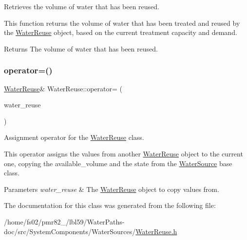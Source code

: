 Retrieves the volume of water that has been reused. 

This function returns the volume of water that has been treated and reused by the \mbox{\hyperlink{classWaterReuse}{Water\+Reuse}} object, based on the current treatment capacity and demand.

\begin{DoxyReturn}{Returns}
The volume of water that has been reused. 
\end{DoxyReturn}
\mbox{\label{classWaterReuse_ab0a905840bfc092d9bf9f69e94262948}} 
\subsubsection{\texorpdfstring{operator=()}{operator=()}}
{\footnotesize\ttfamily \mbox{\hyperlink{classWaterReuse}{Water\+Reuse}}\& Water\+Reuse\+::operator= (\begin{DoxyParamCaption}\item[{const \mbox{\hyperlink{classWaterReuse}{Water\+Reuse}} \&}]{water\+\_\+reuse }\end{DoxyParamCaption})}



Assignment operator for the \mbox{\hyperlink{classWaterReuse}{Water\+Reuse}} class. 

This operator assigns the values from another \mbox{\hyperlink{classWaterReuse}{Water\+Reuse}} object to the current one, copying the {\ttfamily available\+\_\+volume} and the state from the {\ttfamily \mbox{\hyperlink{classWaterSource}{Water\+Source}}} base class.


\begin{DoxyParams}{Parameters}
{\em water\+\_\+reuse} & The \mbox{\hyperlink{classWaterReuse}{Water\+Reuse}} object to copy values from. \\
\hline
\end{DoxyParams}


The documentation for this class was generated from the following file\+:\begin{DoxyCompactItemize}
\item 
/home/fs02/pmr82\+\_/lbl59/\+Water\+Paths-\/doc/src/\+System\+Components/\+Water\+Sources/\mbox{\hyperlink{WaterReuse_8h}{Water\+Reuse.\+h}}\end{DoxyCompactItemize}
